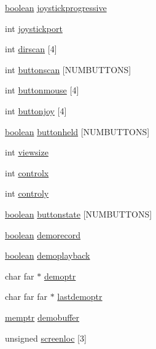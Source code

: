 \begin{DoxyCompactItemize}
\hyperlink{ID__HEAD_8H_a7c6368b321bd9acd0149b030bb8275ed}{boolean} \hyperlink{WL__DEF_8H_aac8667efc78cc65ac4e1e8a5c45669aa}{joystickprogressive}
\item 
int \hyperlink{WL__DEF_8H_a7756f30a454b3f333c7b6292fb73cc1c}{joystickport}
\item 
int \hyperlink{WL__DEF_8H_ac9e7de0629d53e5cfa59e985910855c5}{dirscan} \mbox{[}4\mbox{]}
\item 
int \hyperlink{WL__DEF_8H_a1f33f8928f170492601ca03d06dcaed5}{buttonscan} \mbox{[}NUMBUTTONS\mbox{]}
\item 
int \hyperlink{WL__DEF_8H_aba18dce29b201b4aa0f95ac4b26a230d}{buttonmouse} \mbox{[}4\mbox{]}
\item 
int \hyperlink{WL__DEF_8H_a7d53efcab80b501943d05e6f82ca1b61}{buttonjoy} \mbox{[}4\mbox{]}
\item 
\hyperlink{ID__HEAD_8H_a7c6368b321bd9acd0149b030bb8275ed}{boolean} \hyperlink{WL__DEF_8H_a0c7b9b3b7a3c5a984902f52507d194ab}{buttonheld} \mbox{[}NUMBUTTONS\mbox{]}
\item 
int \hyperlink{WL__DEF_8H_a600cf8c414283a1b5615342c73605284}{viewsize}
\item 
int \hyperlink{WL__DEF_8H_a6343ac6ef7aa896e23ee621de5be7389}{controlx}
\item 
int \hyperlink{WL__DEF_8H_abf431ed8fcd1eb83dbfebb06f325efcc}{controly}
\item 
\hyperlink{ID__HEAD_8H_a7c6368b321bd9acd0149b030bb8275ed}{boolean} \hyperlink{WL__DEF_8H_a20a88de6f72f7a0d0ecae027aa6052d4}{buttonstate} \mbox{[}NUMBUTTONS\mbox{]}
\item 
\hyperlink{ID__HEAD_8H_a7c6368b321bd9acd0149b030bb8275ed}{boolean} \hyperlink{WL__DEF_8H_a29ad9ab3cdb052a60b70348e9de1c33e}{demorecord}
\item 
\hyperlink{ID__HEAD_8H_a7c6368b321bd9acd0149b030bb8275ed}{boolean} \hyperlink{WL__DEF_8H_a49497ef447e431d2e365f96d1fd6f2a8}{demoplayback}
\item 
char far $\ast$ \hyperlink{WL__DEF_8H_aacc691a23998ed80395749868f5124e9}{demoptr}
\item 
char far far $\ast$ \hyperlink{WL__DEF_8H_ac5eb2656741bc6d98c3337122048bf45}{lastdemoptr}
\item 
\hyperlink{ID__MM_8H_a04062decc7eb282b066c65e9137bb9bf}{memptr} \hyperlink{WL__DEF_8H_a1ecc350196af0f2d39e17d758ee66ba3}{demobuffer}
\item 
unsigned \hyperlink{WL__DEF_8H_a7f19075ffe97f9380ab35be486017cd0}{screenloc} \mbox{[}3\mbox{]}
\item 

\end{DoxyCompactItemize}
